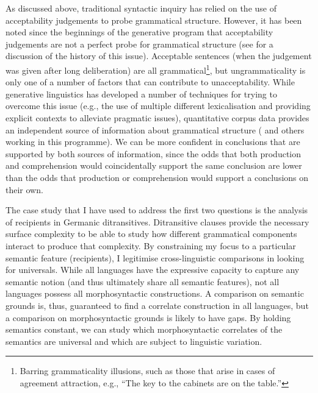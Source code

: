 As discussed above, traditional syntactic inquiry has relied on the use of acceptability judgements to probe grammatical structure. However, it has been noted since the beginnings of the generative program that acceptability judgements are not a perfect probe for grammatical structure (see \citealt{Schutze.1996} for a discussion of the history of this issue). Acceptable sentences (when the judgement was given after long deliberation) are all grammatical\footnote{Barring grammaticality illusions, such as those that arise in cases of agreement attraction, e.g., ``The key to the cabinets are on the table.''}, but ungrammaticality is only one of a number of factors that can contribute to unacceptability. While generative linguistics has developed a number of techniques for trying to overcome this issue (e.g., the use of multiple different lexicalisation and providing explicit contexts to alleviate pragmatic issues), quantitative corpus data provides an independent source of information about grammatical structure (\citealt{Kroch.1989,Kroch.1994} and others working in this programme). We can be more confident in conclusions that are supported by both sources of information, since the odds that both production and comprehension would coincidentally support the same conclusion are lower than the odds that production or comprehension would support a conclusions on their own.

The case study that I have used to address the first two questions is the analysis of recipients in Germanic ditransitives. Ditransitive clauses provide the necessary surface complexity to be able to study how different grammatical components interact to produce that complexity. By constraining my focus to a particular semantic feature (recipients), I legitimise cross-linguistic comparisons in looking for universals. While all languages have the expressive capacity to capture any semantic notion (and thus ultimately share all semantic features), not all languages possess all morphosyntactic constructions. A comparison on semantic grounds is, thus, guaranteed to find a correlate construction in all languages, but a comparison on morphosyntactic grounds is likely to have gaps. By holding semantics constant, we can study which morphosyntactic correlates of the semantics are universal and which are subject to linguistic variation.

